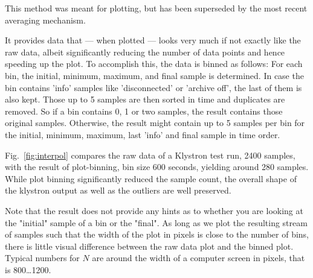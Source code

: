 \NOTE This method was meant for plotting, but has been superseded by the
most recent averaging mechanism.

\noindent It provides data that --- when
plotted --- looks very much if not exactly like the raw data, albeit
significantly reducing the number of data points and hence speeding up
the plot. To accomplish this, the data is binned as follows:
For each bin, the initial,  minimum, maximum, and final sample is
determined. In case the bin contains 'info' samples like 'disconnected'
or 'archive off', the last of them is also kept.
Those up to 5 samples are then sorted in time and duplicates are removed.
So if a bin contains 0, 1 or two samples, the result contains those original
samples. Otherwise, the result might contain up to 5 samples per bin for the
initial, minimum, maximum, last 'info' and final sample in time order.

\noindent Fig.~\ref{fig:interpol} compares the raw data of a Klystron
test run, 2400 samples, with the result of plot-binning, bin size 600
seconds, yielding around 280 samples. While plot binning significantly
reduced the sample count, the overall shape of the klystron output as
well as the outliers are well preserved.

Note that the result does not provide any hints as to whether you are looking
at the "initial" sample of a bin or the "final".
As long as we plot the resulting stream of samples such that the width of
the plot in pixels is close to the number of bins, there is little visual
difference between the raw data plot and the binned plot.  Typical
numbers for $N$ are around the width of a computer screen in pixels,
that is 800\ldots 1200.  
